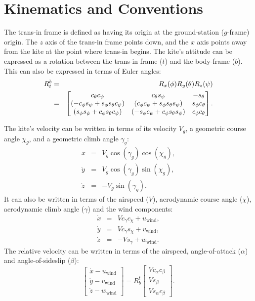 \documentclass{article}
\newcommand{\uwind}{u_{\textrm{wind}}}
\newcommand{\vwind}{v_{\textrm{wind}}}
\newcommand{\wwind}{w_{\textrm{wind}}}
\newcommand{\cchi}{c_\chi}
\newcommand{\cgamma}{c_\gamma}
\newcommand{\cphi}{c_\phi}
\newcommand{\ctheta}{c_\theta}
\newcommand{\cpsi}{c_\psi}
\newcommand{\calpha}{c_\alpha}
\newcommand{\cbeta}{c_\beta}
\newcommand{\schi}{s_\chi}
\newcommand{\sgamma}{s_\gamma}
\newcommand{\sphi}{s_\phi}
\newcommand{\stheta}{s_\theta}
\newcommand{\spsi}{s_\psi}
\newcommand{\salpha}{s_\alpha}
\newcommand{\sbeta}{s_\beta}
\begin{document}
\section{Kinematics and Conventions}
The trans-in frame is defined as having its origin at the
ground-station ($g$-frame) origin.  The $z$ axis of the trans-in frame
points down, and the $x$ axis points away from the kite at the point
where trans-in begins.  The kite's attitude can be expressed as a
rotation between the trans-in frame ($t$) and the body-frame ($b$).
This can also be expressed in terms of Euler angles:
\begin{eqnarray}
R_t^b &=& R_x(\phi) R_y(\theta) R_z(\psi) \\
&=& \begin{bmatrix}
\ctheta \cpsi & \ctheta \spsi & -\stheta \\
(-\cphi\spsi + \sphi \stheta \cpsi) & (\cphi\cpsi + \sphi\stheta\spsi) & \sphi \ctheta \\
(\sphi\spsi + \cphi \stheta \cpsi) & (-\sphi\cpsi + \cphi \stheta \spsi) & \cphi\ctheta
\end{bmatrix}.\notag
\end{eqnarray}

The kite's velocity can be written in terms of its velocity $V_g$, a
geometric course angle $\chi_g$, and a geometric climb angle $\gamma_g$:
\begin{eqnarray}
\dot x &=& V_g \cos(\gamma_g) \cos(\chi_g), \\
\dot y &=& V_g \cos(\gamma_g) \sin(\chi_g), \\
\dot z &=& -V_g \sin(\gamma_g).
\end{eqnarray}
It can also be written in terms of the airspeed ($V$), aerodynamic
course angle ($\chi$), aerodynamic climb angle ($\gamma$) and the wind
components:
\begin{eqnarray}
\dot x &=& V \cgamma \cchi + \uwind, \\
\dot y &=& V \cgamma \schi + \vwind, \\
\dot z &=& -V \sgamma + \wwind.
\end{eqnarray}
The relative velocity can be written in terms of the airspeed,
angle-of-attack ($\alpha$) and angle-of-sideslip ($\beta$):
\begin{equation}
\begin{bmatrix}
\dot x - \uwind \\
\dot y - \vwind \\
\dot z - \wwind
\end{bmatrix} = R_b^t \begin{bmatrix}
V \calpha \cbeta \\
V \sbeta \\
V \salpha \cbeta\end{bmatrix}.
\end{equation}
\end{document}
